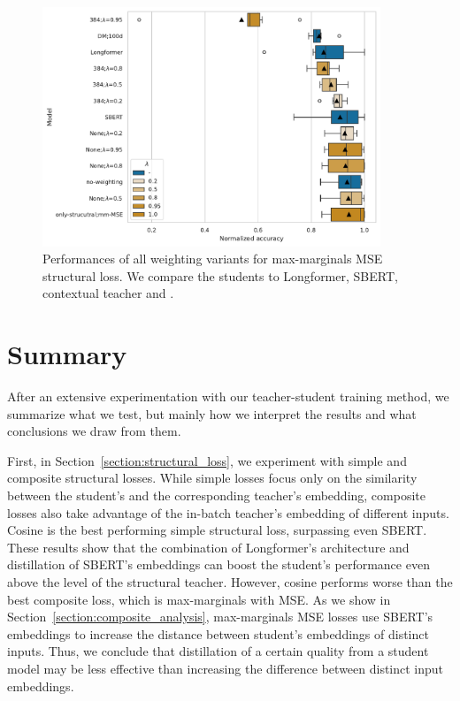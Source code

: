 \begin{figure}

  \includegraphics[width=0.9\textwidth]{img/mm_mse_weighting.pdf}

  \caption{Performances of all weighting variants for max-marginals MSE
  structural loss. We compare the students to Longformer, SBERT,
   contextual teacher and .}

  \label{fig:mm_mse_weighting}

\end{figure}

\section{Summary}\label{section:experiments_summary}

After an extensive experimentation with our teacher-student training method, we
summarize what we test, but mainly how we interpret the results and what
conclusions we draw from them.

First, in Section~\ref{section:structural_loss}, we experiment with simple and
composite structural losses. While simple losses focus only on the similarity
between the student's and the corresponding teacher's embedding, composite
losses also take advantage of the in-batch teacher's embedding of different
inputs. Cosine is the best performing simple structural loss, surpassing even SBERT. These results show that the combination of
Longformer's architecture and distillation
of SBERT's embeddings can boost the student's performance even above the level
of the structural teacher. However, cosine performs worse than the best
composite loss, which is max-marginals with MSE. As we show in
Section~\ref{section:composite_analysis}, max-marginals MSE losses use SBERT's
embeddings to increase the distance between student's embeddings of distinct
inputs. Thus, we conclude that distillation of a certain quality from a student model
may be less effective than increasing the difference between distinct
input embeddings.


